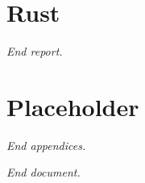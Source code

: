 \documentclass{DIKU-report-variant}
\begin{document}
\section{Rust}

\vfill
\begin{center}\itshape End report.\end{center}
\clearpage

\appendix
\renewcommand\thesection{\Alph{section}}
{}

\section{Placeholder}

\vfill
\begin{center}\itshape End appendices.\end{center}
\clearpage

{}
\printbibliography

\vfill
\begin{center}\itshape End document.\end{center}
\end{document}
